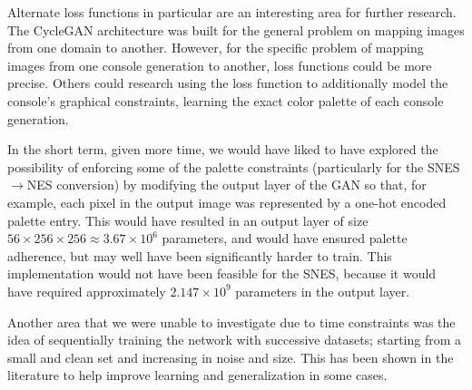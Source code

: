 \documentclass[10pt,twocolumn,letterpaper]{article}
\begin{document}
Alternate loss functions in particular are an interesting area for further research. The CycleGAN architecture was built for the general problem on mapping images from one domain to another. However, for the specific problem of mapping images from one console generation to another, loss functions could be more precise. Others could research using the loss function to additionally model the console's graphical constraints, learning the exact color palette of each console generation.

In the short term, given more time, we would have liked to have explored the possibility of enforcing some of the palette constraints (particularly for the SNES$\rightarrow$NES conversion) by modifying the output layer of the GAN so that, for example, each pixel in the output image was represented by a one-hot encoded palette entry. This would have resulted in an output layer of size $56\times256\times256\approx3.67\times10^6$ parameters, and would have ensured palette adherence, but may well have been significantly harder to train. This implementation would not have been feasible for the SNES, because it would have required approximately $2.147\times10^9$ parameters in the output layer.

Another area that we were unable to investigate due to time constraints was the idea of sequentially training the network with successive datasets; starting from a small and clean set and increasing in noise and size. This has been shown in the literature to help improve learning and generalization in some cases.

%
%

%

%
\end{document}
